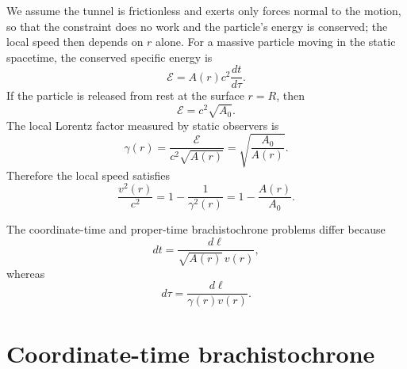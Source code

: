 \documentclass[
  aps,
  prd,
  twocolumn,
  nofootinbib,
  superscriptaddress,
  longbibliography
]{revtex4-2}
\begin{document}
We assume the tunnel is frictionless and exerts only forces normal to
the motion, so that the constraint does no work and the particle's
energy is conserved; the local speed then depends on $r$ alone. For a
massive particle moving in the static spacetime, the conserved specific
energy is
\begin{equation}
\mathcal{E}
=
A(r)c^2\frac{dt}{d\tau}.
\end{equation}
If the particle is released from rest at the surface $r=R$, then
\begin{equation}
\mathcal{E}
=
c^2\sqrt{A_0}.
\label{eq:energy_surface_release}
\end{equation}
The local Lorentz factor measured by static observers is
\begin{equation}
\gamma(r)
=
\frac{\mathcal{E}}{c^2\sqrt{A(r)}}
=
\sqrt{\frac{A_0}{A(r)}}.
\end{equation}
Therefore the local speed satisfies
\begin{equation}
\frac{v^2(r)}{c^2}
=
1-\frac{1}{\gamma^2(r)}
=
1-\frac{A(r)}{A_0}.
\label{eq:local_speed}
\end{equation}

The coordinate-time and proper-time brachistochrone problems differ
because
\begin{equation}
dt
=
\frac{d\ell}{\sqrt{A(r)}\,v(r)},
\label{eq:dt_dl}
\end{equation}
whereas
\begin{equation}
d\tau
=
\frac{d\ell}{\gamma(r)v(r)}.
\label{eq:dtau_dl}
\end{equation}

\section{Coordinate-time brachistochrone}
\end{document}
